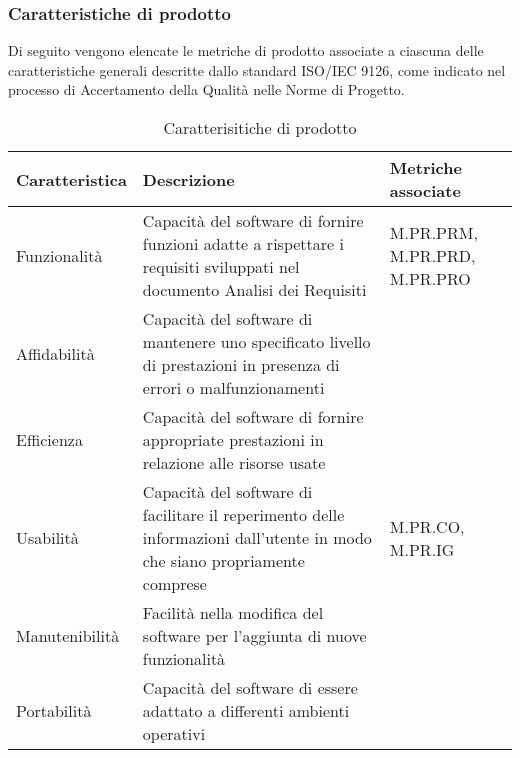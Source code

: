 \subsubsection{Caratteristiche di prodotto}
Di seguito vengono elencate le metriche di prodotto associate a ciascuna delle caratteristiche generali descritte dallo standard ISO/IEC 9126, 
come indicato nel processo di Accertamento della Qualità nelle Norme di Progetto.
\begin{table}[H]
    \centering
    \begin{tabularx}{\textwidth}{| X | X | X |}
    \hline
        \textbf{Caratteristica} & 
        \textbf{Descrizione} &
        \textbf{Metriche associate}\\
    \hline
        Funzionalità & Capacità del software di fornire funzioni adatte a rispettare i requisiti sviluppati nel documento Analisi dei Requisiti & M.PR.PRM, M.PR.PRD, M.PR.PRO \\
    \hline
        Affidabilità & Capacità del software di mantenere uno specificato livello di prestazioni in presenza di errori o malfunzionamenti & \\
    \hline
        Efficienza & Capacità del software di fornire appropriate prestazioni in relazione alle risorse usate & \\
    \hline
        Usabilità & Capacità del software di facilitare il reperimento delle informazioni dall'utente in modo che siano propriamente comprese & M.PR.CO, M.PR.IG \\
    \hline
        Manutenibilità & Facilità nella modifica del software per l'aggiunta di nuove funzionalità & \\
    \hline
        Portabilità & Capacità del software di essere adattato a differenti ambienti operativi & \\
    \hline
    \end{tabularx}
    \caption{Caratterisitiche di prodotto}
    \label{tab:caratteristiche_prodotto} 
\end{table}






